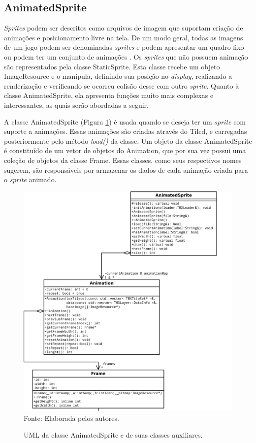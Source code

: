 \subsection{AnimatedSprite}
%
%
\textit{Sprites} podem ser descritos como arquivos de imagem que suportam criação de animações e posicionamento livre na tela. De um modo geral, todas as imagens de um jogo podem ser denominadas \textit{sprites} e podem apresentar um quadro fixo ou podem ter um conjunto de animações \cite{Novatec}. Os \textit{sprites} que não possuem animação são representados pela classe StaticSprite. Esta classe recebe um objeto ImageResource e o manipula, definindo sua posição no \textit{display}, realizando a renderização e verificando se ocorreu colisão desse com outro \textit{sprite}. Quanto à classe AnimatedSprite, ela apresenta funções muito mais complexas e interessantes, as quais serão abordadas a seguir.
\par 
A classe AnimatedSprite (Figura \ref{AnimatedSprite}) é usada quando se deseja ter um \textit{sprite} com suporte a animações. Essas animações são criadas através do Tiled, e carregadas posteriormente pelo método \textit{load()} da classe. Um objeto da classe AnimatedSprite é constituído de um vetor de objetos do Animation, que por sua vez possui uma coleção de objetos da classe Frame. Essas classes, como seus respectivos nomes sugerem, são responsáveis por armazenar os dados de cada animação criada para o \textit{sprite} animado.
%
%
%
\begin{figure}[H]
    \centering
    \caption{UML da classe AnimatedSprite e de suas classes auxiliares.}
    \label{AnimatedSprite}
    \includegraphics[scale = 0.40]{uml/AnimatedSprite.png}
    \\Fonte: Elaborada pelos autores.
\end{figure}
